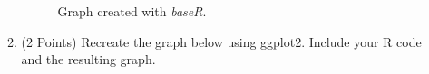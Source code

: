 \documentclass[12pt,letterpaper,final]{article}
\begin{document}
\begin{enumerate}
\begin{enumerate}
\begin{figure}[ht]
\caption{\label{hw01_q2a}
Graph created with {\it baseR}.
}
\end{figure}



\newpage


\item (2 Points) Recreate the graph below using ggplot2.
Include your R code and the resulting graph.


\end{enumerate}
\end{enumerate}
\end{document}
